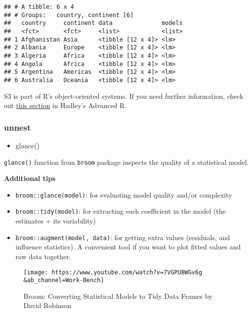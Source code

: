 \documentclass[
]{book}
\newenvironment{Shaded}{\begin{snugshade}}{\end{snugshade}}
\newcommand{\CommentTok}[1]{\textcolor[rgb]{0.56,0.35,0.01}{\textit{#1}}}
\newcommand{\DataTypeTok}[1]{\textcolor[rgb]{0.13,0.29,0.53}{#1}}
\newcommand{\DecValTok}[1]{\textcolor[rgb]{0.00,0.00,0.81}{#1}}
\newcommand{\KeywordTok}[1]{\textcolor[rgb]{0.13,0.29,0.53}{\textbf{#1}}}
\newcommand{\NormalTok}[1]{#1}
\newcommand{\OperatorTok}[1]{\textcolor[rgb]{0.81,0.36,0.00}{\textbf{#1}}}
\newcommand{\StringTok}[1]{\textcolor[rgb]{0.31,0.60,0.02}{#1}}
\providecommand{\tightlist}{%
  \setlength{\itemsep}{0pt}\setlength{\parskip}{0pt}}
\begin{document}
\begin{verbatim}
## # A tibble: 6 x 4
## # Groups:   country, continent [6]
##   country     continent data              models
##   <fct>       <fct>     <list>            <list>
## 1 Afghanistan Asia      <tibble [12 x 4]> <lm>  
## 2 Albania     Europe    <tibble [12 x 4]> <lm>  
## 3 Algeria     Africa    <tibble [12 x 4]> <lm>  
## 4 Angola      Africa    <tibble [12 x 4]> <lm>  
## 5 Argentina   Americas  <tibble [12 x 4]> <lm>  
## 6 Australia   Oceania   <tibble [12 x 4]> <lm>
\end{verbatim}

S3 is part of R's object-oriented systems. If you need further information, check out \href{http://adv-r.had.co.nz/S3.html}{this section} in Hadley's Advanced R.

\hypertarget{unnest}{%
\subsubsection{unnest}\label{unnest}}

\begin{itemize}
\tightlist
\item
  glance()
\end{itemize}

\texttt{glance()} function from \texttt{broom} package inspects the quality of a statistical model.

\textbf{Additional tips}

\begin{itemize}
\tightlist
\item
  \texttt{broom::glance(model)}: for evaluating model quality and/or complexity
\item
  \texttt{broom::tidy(model)}: for extracting each coefficient in the model (the estimates + its variability)
\item
  \texttt{broom::augment(model,\ data)}: for getting extra values (residuals, and influence statistics). A convenient tool if you want to plot fitted values and raw data together.
\end{itemize}

\begin{figure}
\centering
\texttt{[image: https://www.youtube.com/watch?v=7VGPUBWGv6g\\\&ab\_channel=Work-Bench]}
\caption{Broom: Converting Statistical Models to Tidy Data Frames by David Robinson}
\end{figure}

\begin{Shaded}
\end{Shaded}
\end{document}
